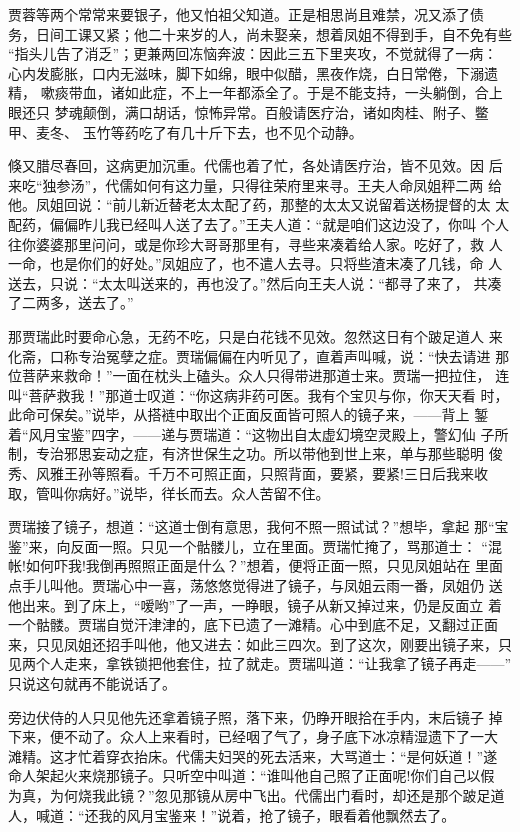 贾蓉等两个常常来要银子，他又怕祖父知道。正是相思尚且难禁，况又添了债
务，日间工课又紧；他二十来岁的人，尚未娶亲，想着凤姐不得到手，自不免有些
“指头儿告了消乏”；更兼两回冻恼奔波：因此三五下里夹攻，不觉就得了一病：
心内发膨胀，口内无滋味，脚下如绵，眼中似醋，黑夜作烧，白日常倦，下溺遗精，
嗽痰带血，诸如此症，不上一年都添全了。于是不能支持，一头躺倒，合上眼还只
梦魂颠倒，满口胡话，惊怖异常。百般请医疗治，诸如肉桂、附子、鳖甲、麦冬、
玉竹等药吃了有几十斤下去，也不见个动静。

倏又腊尽春回，这病更加沉重。代儒也着了忙，各处请医疗治，皆不见效。因
后来吃“独参汤”，代儒如何有这力量，只得往荣府里来寻。王夫人命凤姐秤二两
给他。凤姐回说：“前儿新近替老太太配了药，那整的太太又说留着送杨提督的太
太配药，偏偏昨儿我已经叫人送了去了。”王夫人道：“就是咱们这边没了，你叫
个人往你婆婆那里问问，或是你珍大哥哥那里有，寻些来凑着给人家。吃好了，救
人一命，也是你们的好处。”凤姐应了，也不遣人去寻。只将些渣末凑了几钱，命
人送去，只说：“太太叫送来的，再也没了。”然后向王夫人说：“都寻了来了，
共凑了二两多，送去了。”

那贾瑞此时要命心急，无药不吃，只是白花钱不见效。忽然这日有个跛足道人
来化斋，口称专治冤孽之症。贾瑞偏偏在内听见了，直着声叫喊，说：“快去请进
那位菩萨来救命！”一面在枕头上磕头。众人只得带进那道士来。贾瑞一把拉住，
连叫“菩萨救我！”那道士叹道：“你这病非药可医。我有个宝贝与你，你天天看
时，此命可保矣。”说毕，从搭裢中取出个正面反面皆可照人的镜子来，——背上
錾着“风月宝鉴”四字，——递与贾瑞道：“这物出自太虚幻境空灵殿上，警幻仙
子所制，专治邪思妄动之症，有济世保生之功。所以带他到世上来，单与那些聪明
俊秀、风雅王孙等照看。千万不可照正面，只照背面，要紧，要紧!三日后我来收
取，管叫你病好。”说毕，徉长而去。众人苦留不住。

贾瑞接了镜子，想道：“这道士倒有意思，我何不照一照试试？”想毕，拿起
那“宝鉴”来，向反面一照。只见一个骷髅儿，立在里面。贾瑞忙掩了，骂那道士：
“混帐!如何吓我!我倒再照照正面是什么？”想着，便将正面一照，只见凤姐站在
里面点手儿叫他。贾瑞心中一喜，荡悠悠觉得进了镜子，与凤姐云雨一番，凤姐仍
送他出来。到了床上，“嗳哟”了一声，一睁眼，镜子从新又掉过来，仍是反面立
着一个骷髅。贾瑞自觉汗津津的，底下已遗了一滩精。心中到底不足，又翻过正面
来，只见凤姐还招手叫他，他又进去：如此三四次。到了这次，刚要出镜子来，只
见两个人走来，拿铁锁把他套住，拉了就走。贾瑞叫道：“让我拿了镜子再走——”
只说这句就再不能说话了。

旁边伏侍的人只见他先还拿着镜子照，落下来，仍睁开眼拾在手内，末后镜子
掉下来，便不动了。众人上来看时，已经咽了气了，身子底下冰凉精湿遗下了一大
滩精。这才忙着穿衣抬床。代儒夫妇哭的死去活来，大骂道士：“是何妖道！”遂
命人架起火来烧那镜子。只听空中叫道：“谁叫他自己照了正面呢!你们自己以假
为真，为何烧我此镜？”忽见那镜从房中飞出。代儒出门看时，却还是那个跛足道
人，喊道：“还我的风月宝鉴来！”说着，抢了镜子，眼看着他飘然去了。

